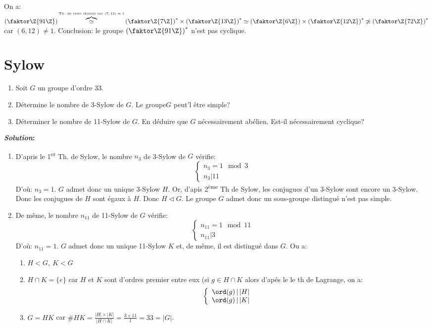 \begin{remark}
	On a: $\left(\faktor\Z{91\Z}\right)\overbrace{\simeq}^{\mbox{\tiny Th. de rests chinois car $(7,13)=1$}} \left(\faktor\Z{7\Z}\right)^\ast\times \left(\faktor\Z{13\Z}\right)^\ast\simeq \left(\faktor\Z{6\Z}\right)\times \left(\faktor\Z{12\Z}\right)^\ast\not\simeq \left(\faktor\Z{72\Z}\right)^\ast$ car $(6,12)\neq 1$. Conclusion: le groupe $\left(\faktor\Z{91\Z}\right)^\ast$ n'est pas cyclique.
\end{remark}

\section{Sylow}

\begin{examplebox}
	\begin{enumerate}
		\item Soit $G$ un groupe d'ordre 33.	
		\item Détermine le nombre de 3-Sylow de $G$. Le groupe$G$ peut'l être simple?
		\item Déterminer le nombre de 11-Sylow de $G$. En déduire que $G$ nécessairement abélien. Est-il nécessairement cyclique?
	\end{enumerate}
		\textbf{\emph{Solution}:}

	\begin{enumerate}
		\item D'apris le 1\textsuperscript{er} Th. de Sylow, le nombre $n_3$ de 3-Sylow de $G$ vérifie:
		$$\left\{\begin{array}{r}n_3 = 1\mod 3\\n_3 | 11\end{array}\right.$$
		D'où: $n_3=1$. $G$ admet donc un unique 3-Sylow $H$. Or, d'apis 2\textsuperscript{ème} Th de Sylow, les conjugues d'un 3-Sylow sont encore un 3-Sylow. Donc les conjugues de $H$ sont égaux à $H$. Donc $H\lhd G$. Le groupe $G$ admet donc un sous-groupe distingué n'est pas simple.
		
		\item De même, le nombre $n_{11}$ de 11-Sylow de $G$ vérifie:
		$$\left\{\begin{array}{r}n_{11} = 1\mod 11\\n_{11} | 3\end{array}\right.$$
		D'où: $n_{11}=1$.
		$G$ admet donc un unique 11-Sylow $K$ et, de même, il est distingué dans $G$.
		Ou a:
		\begin{enumerate}
			\item $H<  G,\ K<  G$
			\item $H\cap K=\{e\}$ car $H$ et $K$ sont d'ordres premier entre eux (si $g\in H\cap K$ alors d'apés le le th de Lagrange, on a:
			$$\left\{\begin{array}{r}\ord(g)\,|\, |H|\\\ord(g)\,|\, |K|\end{array}\right.$$
			\item $G=HK$ car $\#HK=\frac{|H|\times|K|}{|H\cap K|}=\frac{3\times 11}{1}=33=|G|$. 
		\end{enumerate}


\end{enumerate}
\end{examplebox}
